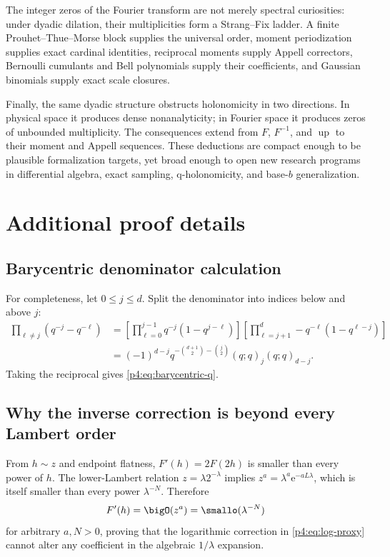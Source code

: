\documentclass[11pt]{article}
\numberwithin{equation}{section}
\theoremstyle{definition}
\theoremstyle{remark}
\newcommand{\Up}{\operatorname{up}}
\newcommand{\e}{\mathrm e}
\begin{document}
The integer zeros of the Fourier transform are not merely spectral curiosities: under dyadic dilation, their multiplicities form a Strang--Fix ladder.  A finite Prouhet--Thue--Morse block supplies the universal order, moment periodization supplies exact cardinal identities, reciprocal moments supply Appell correctors, Bernoulli cumulants and Bell polynomials supply their coefficients, and Gaussian binomials supply exact scale closures.

Finally, the same dyadic structure obstructs holonomicity in two directions.  In physical space it produces dense nonanalyticity; in Fourier space it produces zeros of unbounded multiplicity.  The consequences extend from $F$, $F^{-1}$, and $\Up$ to their moment and Appell sequences.  These deductions are compact enough to be plausible formalization targets, yet broad enough to open new research programs in differential algebra, exact sampling, q-holonomicity, and base-$b$ generalization.

\appendix
\renewcommand*{\theHsection}{\arabic{part}.\arabic{section}}

\section{Additional proof details}
\label{p4:app:proof-details}

\subsection{Barycentric denominator calculation}
For completeness, let $0\le j\le d$.  Split the denominator into indices below and above $j$:
\begin{align*}
 \prod_{\ell\ne j}(q^{-j}-q^{-\ell})
 &=\left[\prod_{\ell=0}^{j-1}q^{-j}(1-q^{j-\ell})\right]
   \left[\prod_{\ell=j+1}^{d}-q^{-\ell}(1-q^{\ell-j})\right]\\
 &=(-1)^{d-j}q^{-\binom{d+1}{2}-\binom j2}
   (q;q)_j(q;q)_{d-j}.
\end{align*}
Taking the reciprocal gives \eqref{p4:eq:barycentric-q}.

\subsection{Why the inverse correction is beyond every Lambert order}
From $h\sim z$ and endpoint flatness, $F'(h)=2F(2h)$ is smaller than every power of $h$.  The lower-Lambert relation $z=\lambda2^{-\lambda}$ implies
$z^a=\lambda^a\e^{-aL\lambda}$, which is itself smaller than every power $\lambda^{-N}$.  Therefore
\[
 F'(h)=\bigO(z^a)=\smallo(\lambda^{-N})
\]
for arbitrary $a,N>0$, proving that the logarithmic correction in \eqref{p4:eq:log-proxy} cannot alter any coefficient in the algebraic $1/\lambda$ expansion.
\end{document}
